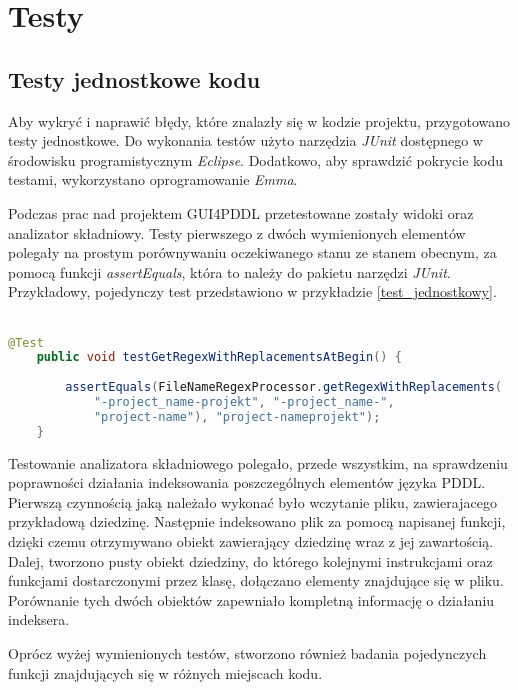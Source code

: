 \chapter{Testy}
\section{Testy jednostkowe kodu}

Aby wykryć i naprawić błędy, które znalazły się w kodzie projektu, przygotowano testy jednostkowe. Do wykonania testów użyto narzędzia \textit{JUnit} dostępnego w środowisku programistycznym \textit{Eclipse}. Dodatkowo, aby sprawdzić pokrycie kodu testami, wykorzystano oprogramowanie \textit{Emma}.

Podczas prac nad projektem GUI4PDDL przetestowane zostały widoki oraz analizator składniowy. Testy pierwszego z dwóch wymienionych elementów polegały na prostym porównywaniu oczekiwanego stanu ze stanem obecnym, za pomocą funkcji \textit{assertEquals}, która to należy do pakietu narzędzi \textit{JUnit}. Przykładowy, pojedynczy test przedstawiono w przykładzie \ref{test_jednostkowy}.\\\\
\begin{Code}
\begin{lstlisting}[language=JAVA,frame=single,label={test_jednostkowy}, caption={Przykładowy test jedostkowy}]
	@Test
	public void testGetRegexWithReplacementsAtBegin() {
		
		assertEquals(FileNameRegexProcessor.getRegexWithReplacements(
			"-project_name-projekt", "-project_name-", 
			"project-name"), "project-nameprojekt");
	}
\end{lstlisting}
\end{Code}


Testowanie analizatora składniowego polegało, przede wszystkim, na sprawdzeniu poprawności działania indeksowania poszczególnych elementów języka PDDL. Pierwszą czynnością jaką należało wykonać było wczytanie pliku, zawierajacego przykładową dziedzinę. Następnie indeksowano plik za pomocą napisanej funkcji, dzięki czemu otrzymywano obiekt zawierający dziedzinę wraz z jej zawartością. Dalej, tworzono pusty obiekt dziedziny, do którego kolejnymi instrukcjami oraz funkcjami dostarczonymi przez klasę, dołączano elementy znajdujące się w pliku. Porównanie tych dwóch obiektów zapewniało kompletną informację o działaniu indeksera.

Oprócz wyżej wymienionych testów, stworzono również badania pojedynczych funkcji znajdujących się w różnych miejscach kodu.

